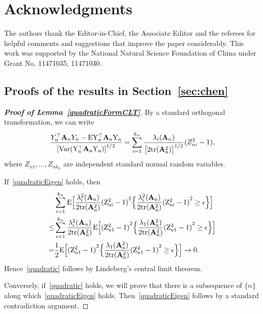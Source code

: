 \documentclass[times,sort&compress,3p]{elsarticle}
\newcommand{\mytr}{\rm tr}
\newcommand{\myE}{\rm E}
\newcommand{\myVar}{\rm Var}
\newcommand{\BA}{\mathbf{A}}    \newcommand{\BB}{\mathbf{B}}    \newcommand{\BC}{\mathbf{C}}    \newcommand{\BD}{\mathbf{D}}    \newcommand{\BE}{\mathbf{E}}    \newcommand{\BF}{\mathbf{F}}    \newcommand{\BG}{\mathbf{G}}    \newcommand{\BH}{\mathbf{H}}    \newcommand{\BI}{\mathbf{I}}    \newcommand{\BJ}{\mathbf{J}}    \newcommand{\BK}{\mathbf{K}}    \newcommand{\BL}{\mathbf{L}}
\theoremstyle{plain}
\theoremstyle{definition}
\theoremstyle{remark}
\begin{document}
\section*{Acknowledgments}
The authors thank the Editor-in-Chief, the Associate Editor and the referees for helpful comments and suggestions that improve the paper considerably.
This work was supported by the National Natural Science Foundation of China under Grant No. 11471035, 11471030.
\begin{appendices}
    \section{Proofs of the results in Section~\ref{sec:chen}}\label{appendixA}
\begin{proof}[\textbf{Proof of Lemma~\ref{quadraticFormCLT}}]
    By a standard orthogonal transformation, we can write
    \begin{equation*}
        \frac{Y_n^\top  \BA_n Y_n-\myE Y_n^\top  \BA_n Y_n}{{[\myVar(Y_n^\top  \BA_n Y_n)]}^{1/2}}=\sum_{i=1}^{k_n}\frac{\lambda_i(\BA_n)}{{\big[2\mytr(\BA_n^2)\big]}^{1/2}}(Z_{ni}^2-1),
    \end{equation*}
    where $Z_{n1},\ldots,Z_{n k_n}$ are independent standard normal random variables.

    If~\ref{quadraticEigen} holds, then
    \begin{equation*}
        \begin{aligned}
            &\sum_{i=1}^{k_n}\myE\Big[\frac{\lambda_i^2(\BA_n)}{2\mathrm{tr}(\BA_n^2)}{(Z_{ni}^2-1)}^2\Big\{\frac{\lambda_i^2(\BA_n)}{2\mathrm{tr}(\BA_n^2)}{(Z_{ni}^2-1)}^2\geq \epsilon\Big\}\Big]\\
            \leq&\sum_{i=1}^{k_n}
            \frac{\lambda_i^2(\BA_n)}{2\mytr(\BA_n^2)}
            \myE\Big[{(Z_{n1}^2-1)}^2\Big\{\frac{\lambda_{1}(\BA_n^2)}{2\mytr(\BA_n^2)}{(Z_{n1}^2-1)}^2\geq \epsilon\Big\}\Big]\\
            =&
            \frac{1}{2}\myE\Big[{(Z_{n1}^2-1)}^2\Big\{\frac{\lambda_{1}(\BA_n^2)}{2\mytr(\BA_n^2)}{(Z_{n1}^2-1)}^2\geq \epsilon\Big\}\Big]\to 0.
        \end{aligned}
    \end{equation*}
    Hence~\ref{quadratic} follows by Lindeberg's central limit theorem.

    Conversely, if~\ref{quadratic} holds, we will prove that there is a subsequence of $\{n\}$ along which~\ref{quadraticEigen} holds. Then~\ref{quadraticEigen} follows by a standard contradiction argument. 


\end{proof}
\end{appendices}
\end{document}
